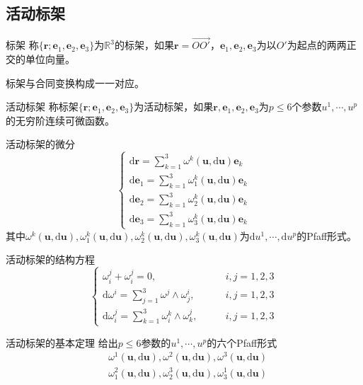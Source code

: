 \documentclass[lang = cn, scheme = chinese, thmcnt = section]{elegantbook}
\newcommand{\R}{\mathbb{R}}            %
\newcommand{\bs}{\boldsymbol}          %
\newcommand{\dd}{\mathrm{d}}           %
\begin{document}
\subsection{活动标架}

\begin{definition}{标架}
	称$\{ \bs{r};\bs{e}_1,\bs{e}_2,\bs{e}_3\}$为$\R^3$的标架，如果$\bs{r}=\overrightarrow{OO'}$，$\bs{e}_1,\bs{e}_2,\bs{e}_3$为以$O'$为起点的两两正交的单位向量。
\end{definition}

\begin{remark}
	标架与合同变换构成一一对应。
\end{remark}

\begin{definition}{活动标架}
	称标架$\{ \bs{r};\bs{e}_1,\bs{e}_2,\bs{e}_3 \}$为活动标架，如果$\bs{r},\bs{e}_1,\bs{e}_2,\bs{e}_3$为$p\le 6$个参数$u^1,\cdots,u^p$的无穷阶连续可微函数。
\end{definition}

\begin{definition}{活动标架的微分}
	$$
	\begin{cases}
		\dd\bs{r}=\sum_{k=1}^{3}\omega^k(\bs{u},\dd\bs{u})\bs{e}_k\\
		\dd\bs{e}_1=\sum_{k=1}^{3}\omega^k_1(\bs{u},\dd\bs{u})\bs{e}_k\\
		\dd\bs{e}_2=\sum_{k=1}^{3}\omega^k_2(\bs{u},\dd\bs{u})\bs{e}_k\\
		\dd\bs{e}_3=\sum_{k=1}^{3}\omega^k_3(\bs{u},\dd\bs{u})\bs{e}_k
	\end{cases}
	$$
	其中$\omega^k(\bs{u},\dd\bs{u}),\omega^k_1(\bs{u},\dd\bs{u}),\omega^k_2(\bs{u},\dd\bs{u}),\omega^k_3(\bs{u},\dd\bs{u})$为$\dd u^1,\cdots,\dd u^p$的Pfaff形式。
\end{definition}

\begin{theorem}{活动标架的结构方程}
	$$
	\begin{cases}
		\omega_i^j+\omega_i^j=0,\qquad & i,j=1,2,3\\
		\dd\omega^i=\sum_{j=1}^{3}\omega^j\wedge\omega_j^i,\qquad & i,j=1,2,3\\
		\dd\omega^j_i=\sum_{k=1}^{3}\omega^k_i\wedge\omega_k^j,\qquad & i,j=1,2,3
	\end{cases}
	$$
\end{theorem}

\begin{theorem}{活动标架的基本定理}
	给出$p\le 6$参数的$u^1,\cdots,u^p$的六个Pfaff形式%
	\begin{align*}
		& \omega^1(\bs{u},\dd\bs{u}),\omega^2(\bs{u},\dd\bs{u}),\omega^3(\bs{u},\dd\bs{u})\\
		& \omega_1^2(\bs{u},\dd\bs{u}),\omega_2^3(\bs{u},\dd\bs{u}),\omega_3^1(\bs{u},\dd\bs{u})
	\end{align*}
\end{theorem}
\end{document}
